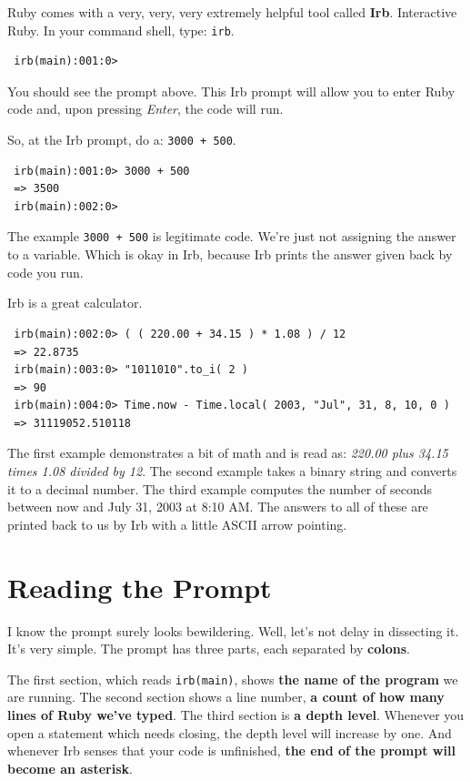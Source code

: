 \documentclass[10pt,twoside]{report}
\begin{document}
Ruby comes with a very, very, very extremely helpful tool called
\textbf{Irb}. Interactive Ruby. In your command shell, type: 
\lstinline[breaklines=false]|irb|.

\begin{lstlisting}
 irb(main):001:0>
\end{lstlisting}

You should see the prompt above. This Irb prompt will allow you to
enter Ruby code and, upon pressing \emph{Enter}, the code will run.

So, at the Irb prompt, do a: \lstinline[breaklines=false]|3000 + 500|.

\begin{lstlisting}
 irb(main):001:0> 3000 + 500
 => 3500
 irb(main):002:0>
\end{lstlisting}

The example \lstinline[breaklines=false]|3000 + 500| is legitimate
code. We're just not assigning the answer to a variable. Which is okay
in Irb, because Irb prints the answer given back by code you run.

Irb is a great calculator.

\begin{lstlisting}
 irb(main):002:0> ( ( 220.00 + 34.15 ) * 1.08 ) / 12 
 => 22.8735
 irb(main):003:0> "1011010".to_i( 2 )
 => 90
 irb(main):004:0> Time.now - Time.local( 2003, "Jul", 31, 8, 10, 0 )
 => 31119052.510118
\end{lstlisting}

The first example demonstrates a bit of math and is read as:
\emph{220.00 plus 34.15 times 1.08 divided by 12}. The second example
takes a binary string and converts it to a decimal number. The third
example computes the number of seconds between now and July 31, 2003
at 8:10 AM. The answers to all of these are printed back to us by Irb
with a little ASCII arrow pointing.

\section{Reading the Prompt}

I know the prompt surely looks bewildering. Well, let's not delay in
dissecting it. It's very simple. The prompt has three parts, each
separated by \textbf{colons}.

The first section, which reads \lstinline[breaklines=false]|irb(main)|,
shows \textbf{the name of the program} we are running. The second
section shows a line number, \textbf{a count of how many lines of Ruby
  we've typed}. The third section is \textbf{a depth level}. Whenever
you open a statement which needs closing, the depth level will
increase by one. And whenever Irb senses that your code is unfinished,
\textbf{the end of the prompt will become an asterisk}.
\end{document}
